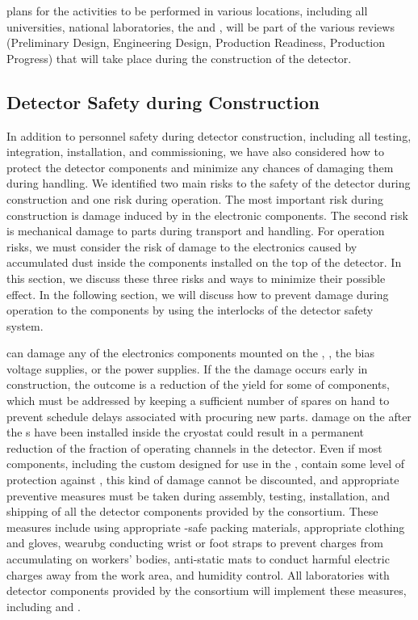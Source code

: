  plans for the activities to be performed in various
locations, including all universities, national laboratories,
the  and , will be part of the 
various reviews (Preliminary Design, Engineering Design, Production 
Readiness, Production Progress) that will take place during the construction of the detector.

\subsection{Detector Safety during Construction}
\label{sec:fdsp-tpcelec-safety-detcon}


In addition to personnel safety during detector
construction, including all testing, 
integration, installation, and commissioning, we have also
considered how to protect the detector
components and minimize any chances of damaging
them during handling. We identified two main risks 
to the safety of the detector during construction and one risk during
operation. The most important risk during construction is damage 
induced by  in the 
electronic components. The second risk is mechanical damage to 
parts during transport and handling. For operation risks, we
must consider the risk of damage to the electronics 
caused by accumulated dust inside the components
installed on the top of the detector. In this section, 
we discuss these three risks and ways to minimize their possible 
effect. In the following section, we will discuss how to prevent
damage during operation to the  components 
by using the interlocks of the detector safety system.

 can damage any of the electronics
components mounted on the , ,
the bias voltage supplies, or the power supplies. If the
the damage occurs early in construction, 
the outcome is a reduction
of the yield for some of components, which must be
addressed by keeping a sufficient number of spares on hand to prevent
schedule delays associated with procuring new parts. 
damage on the  after the s have been
installed inside the cryostat could result in a permanent
reduction of the fraction of operating channels in the
detector. Even if most components, including the custom 
 designed for use in the , contain 
some level of protection  against , this kind of damage cannot be discounted, and appropriate 
preventive measures must be taken during  
assembly, testing, installation, and shipping of all the detector 
components provided by the  consortium. These 
measures include using appropriate -safe packing materials, 
appropriate clothing and gloves, wearubg conducting wrist or foot straps 
to prevent charges from accumulating 
on workers' bodies, anti-static mats to conduct harmful electric 
charges away from the work area, and humidity control. All laboratories with detector components provided by the  consortium will implement these
measures,
including  and . 


